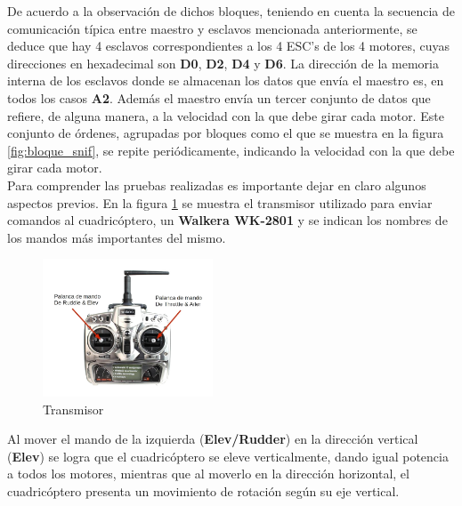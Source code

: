 \documentclass[main]{subfiles}
\begin{document}
De acuerdo a la observaci\'on de dichos bloques, teniendo en cuenta la secuencia de comunicación típica entre maestro y esclavos mencionada anteriormente, se deduce que hay 4 esclavos correspondientes a los 4 ESC's de los 4 motores, cuyas direcciones en hexadecimal son \textbf{D0}, \textbf{D2}, \textbf{D4} y \textbf{D6}. La direcci\'on de la memoria interna de los esclavos donde se almacenan los datos que env\'ia el maestro es, en todos los casos \textbf{A2}. Adem\'as el maestro env\'ia un tercer conjunto de datos que refiere, de alguna manera, a la velocidad con la que debe girar cada motor.
Este conjunto de \'ordenes, agrupadas por bloques como el que se muestra en la figura \ref{fig:bloque_snif}, se repite peri\'odicamente, indicando la velocidad con la que debe girar cada motor.\\

Para comprender las pruebas realizadas es importante dejar en claro algunos aspectos previos. En la figura \ref{fig:tx} se muestra el transmisor utilizado para enviar comandos al cuadric\'optero, un \textbf{Walkera WK-2801} y se indican los nombres de los mandos m\'as importantes del mismo.


\begin{figure}
	\vspace{-20pt}
	\begin{center}
	\includegraphics[width=0.45\textwidth]{./pics_sniffer/tx.jpg}
	\end{center}
	\vspace{-25pt}
	\caption{Transmisor}
	\label{fig:tx}
	\vspace{20pt}
\end{figure}

Al mover el mando de la izquierda (\textbf{Elev/Rudder}) en la direcci\'on vertical (\textbf{Elev}) se logra que el cuadric\'optero se eleve verticalmente, dando igual potencia a todos los motores, mientras que al moverlo en la direcci\'on horizontal, el cuadric\'optero presenta un movimiento de rotaci\'on seg\'un su eje vertical.\\
\end{document}
